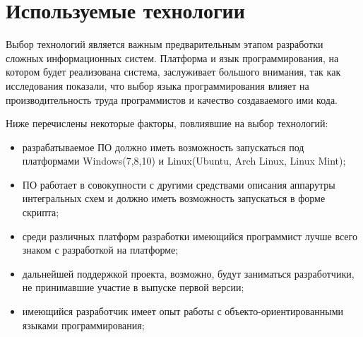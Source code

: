 \lstset{style=fsharpstyle}

\section{Используемые технологии}
\label{sec:practice:technology_used}

Выбор технологий является важным предварительным этапом разработки сложных информационных систем.
Платформа и язык программирования, на котором будет реализована система, заслуживает большого внимания, так как исследования показали, что выбор языка программирования влияет на производительность труда программистов и качество создаваемого ими кода.

Ниже перечислены некоторые факторы, повлиявшие на выбор технологий:
\begin{itemize}
\item разрабатываемое ПО должно иметь возможность запускаться под платформами Windows(7,8,10) и Linux(Ubuntu, Arch Linux, Linux Mint);
\item ПО работает в совокупности с другими средствами описания аппарутры интегральных схем и должно иметь возможность запускаться в форме скрипта;
\item среди различных платформ разработки имеющийся программист лучше всего знаком с разработкой на платформе;
\item дальнейшей поддержкой проекта, возможно, будут заниматься разработчики, не принимавшие участие в выпуске первой версии;
\item имеющийся разработчик имеет опыт работы с объекто-ориентированными языками программирования;
\end{itemize}


